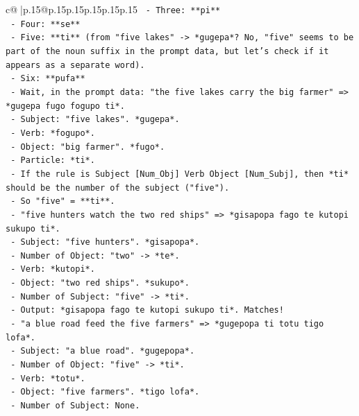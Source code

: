 \documentclass{article}
\begin{document}
{\begin{supertabular}{c@{$\;$}|p{.15\linewidth}@{}p{.15\linewidth}p{.15\linewidth}p{.15\linewidth}p{.15\linewidth}p{.15\linewidth}}
{{{\texttt{          {-} Three: **pi**} \\
\texttt{          {-} Four: **se**} \\
\texttt{          {-} Five: **ti** (from "five lakes" {-}> *gugepa*? No, "five" seems to be part of the noun suffix in the prompt data, but let's check if it appears as a separate word).} \\
\texttt{          {-} Six: **pufa**} \\
\texttt{        {-} Wait, in the prompt data: "the five lakes carry the big farmer" => *gugepa fugo fogupo ti*.} \\
\texttt{          {-} Subject: "five lakes". *gugepa*.} \\
\texttt{          {-} Verb: *fogupo*.} \\
\texttt{          {-} Object: "big farmer". *fugo*.} \\
\texttt{          {-} Particle: *ti*.} \\
\texttt{          {-} If the rule is Subject {[}Num\_Obj{]} Verb Object {[}Num\_Subj{]}, then *ti* should be the number of the subject ("five").} \\
\texttt{          {-} So "five" = **ti**.} \\
\texttt{        {-} "five hunters watch the two red ships" => *gisapopa fago te kutopi sukupo ti*.} \\
\texttt{          {-} Subject: "five hunters". *gisapopa*.} \\
\texttt{          {-} Number of Object: "two" {-}> *te*.} \\
\texttt{          {-} Verb: *kutopi*.} \\
\texttt{          {-} Object: "two red ships". *sukupo*.} \\
\texttt{          {-} Number of Subject: "five" {-}> *ti*.} \\
\texttt{          {-} Output: *gisapopa fago te kutopi sukupo ti*. Matches!} \\
\texttt{        {-} "a blue road feed the five farmers" => *gugepopa ti totu tigo lofa*.} \\
\texttt{          {-} Subject: "a blue road". *gugepopa*.} \\
\texttt{          {-} Number of Object: "five" {-}> *ti*.} \\
\texttt{          {-} Verb: *totu*.} \\
\texttt{          {-} Object: "five farmers". *tigo lofa*.} \\
\texttt{          {-} Number of Subject: None.} \\
}}}
\end{supertabular}}
\end{document}
